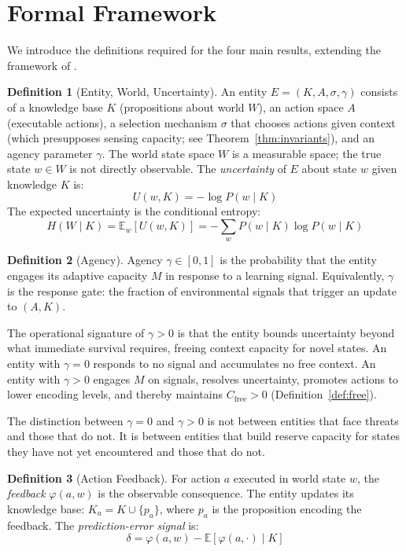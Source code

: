 \documentclass[11pt]{article}
\theoremstyle{definition}
\newtheorem{definition}{Definition}
\theoremstyle{remark}
\begin{document}
\section{Formal Framework}
\label{sec:framework}

We introduce the definitions required for the four main results,
extending the framework of \cite{McCarthy2026a}.

\begin{definition}[Entity, World, Uncertainty]
\label{def:entity}
An entity $E = (K, A, \sigma, \gamma)$ consists of a knowledge base $K$
(propositions about world $W$), an action space $A$ (executable
actions), a selection mechanism $\sigma$ that chooses actions given
context (which presupposes sensing capacity; see
Theorem~\ref{thm:invariants}), and an agency parameter $\gamma$. The world state space $W$ is a
measurable space; the true state $w \in W$ is not directly observable.
The \emph{uncertainty} of $E$ about state $w$ given knowledge $K$ is:
\[
U(w, K) = -\log P(w \mid K)
\]
The expected uncertainty is the conditional entropy:
\[
H(W \mid K) = \mathbb{E}_w[U(w, K)] = -\sum_w P(w \mid K) \log P(w \mid K)
\]
\end{definition}

\begin{definition}[Agency]
\label{def:agency}
Agency $\gamma \in [0, 1]$ is the probability that the entity engages its
adaptive capacity $M$ in response to a learning signal. Equivalently,
$\gamma$ is the response gate: the fraction of environmental signals that
trigger an update to $(A, K)$.

The operational signature of $\gamma > 0$ is that the entity bounds
uncertainty beyond what immediate survival requires, freeing context
capacity for novel states. An entity with $\gamma = 0$ responds to no
signal and accumulates no free context. An entity with $\gamma > 0$
engages $M$ on signals, resolves uncertainty, promotes actions to lower
encoding levels, and thereby maintains $C_{\mathrm{free}} > 0$
(Definition~\ref{def:free}).

The distinction between $\gamma = 0$ and $\gamma > 0$ is not between
entities that face threats and those that do not. It is between entities
that build reserve capacity for states they have not yet encountered and
those that do not.
\end{definition}

\begin{definition}[Action Feedback]
\label{def:feedback}
For action $a$ executed in world state $w$, the \emph{feedback}
$\varphi(a, w)$ is the observable consequence. The entity updates its
knowledge base: $K_a = K \cup \{p_a\}$, where $p_a$ is the
proposition encoding the feedback. The \emph{prediction-error signal} is:
\[
\delta = \varphi(a, w) - \mathbb{E}[\varphi(a, \cdot) \mid K]
\]
\end{definition}
\end{document}
